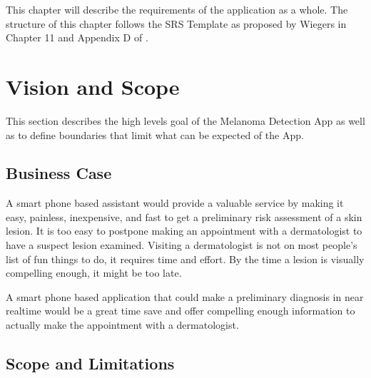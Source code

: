 This chapter will describe the requirements of the application as a whole. The structure of this chapter follows the SRS Template as proposed by Wiegers in Chapter 11 and Appendix D of \cite{wiegers2013software}.

\section{Vision and Scope}

    This section describes the high levels goal of the Melanoma Detection App as well as to define boundaries that limit what can be expected of the App.

    \subsection{Business Case}

        A smart phone based assistant would provide a valuable service by making it easy, painless, inexpensive, and fast to get a preliminary risk assessment of a skin lesion. It is too easy to postpone making an appointment with a dermatologist to have a suspect lesion examined. Visiting a dermatologist is not on most people’s list of fun things to do, it requires time and effort. By the time a lesion is visually compelling enough, it might be too late.

A smart phone based application that could make a preliminary diagnosis in near realtime would be a great time save and offer compelling enough information to actually make the appointment with a dermatologist.

    \subsection{Scope and Limitations}
